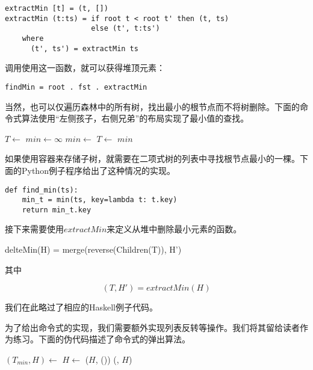 \documentclass{ctexart}
\begin{document}
\lstset{language=Haskell}
\begin{lstlisting}[style=Haskell]
extractMin [t] = (t, [])
extractMin (t:ts) = if root t < root t' then (t, ts)
                    else (t', t:ts')
    where
      (t', ts') = extractMin ts
\end{lstlisting}

调用使用这一函数，就可以获得堆顶元素：

\begin{lstlisting}[style=Haskell]
findMin = root . fst . extractMin
\end{lstlisting}

当然，也可以仅遍历森林中的所有树，找出最小的根节点而不将树删除。下面的命令式算法使用“左侧孩子，右侧兄弟”的布局实现了最小值的查找。

\begin{algorithmic}[1]
  \State $T \gets $ 
  \State $min \gets \infty$
      \State $min \gets $ 
    \EndIf
    \State $T \gets $ 
  \EndWhile
  \State \Return $min$
\EndFunction
\end{algorithmic}

如果使用容器来存储子树，就需要在二项式树的列表中寻找根节点最小的一棵。下面的Python例子程序给出了这种情况的实现。

\lstset{language=Python}
\begin{lstlisting}
def find_min(ts):
    min_t = min(ts, key=lambda t: t.key)
    return min_t.key
\end{lstlisting}

接下来需要使用$extractMin$来定义从堆中删除最小元素的函数。

\be
delteMin(H) = merge(reverse(Children(T)), H')
\ee

其中

\[
  (T, H') = extractMin(H)
\]

我们在此略过了相应的Haskell例子代码。

为了给出命令式的实现，我们需要额外实现列表反转等操作。我们将其留给读者作为练习。下面的伪代码描述了命令式的弹出算法。

\begin{algorithmic}[1]
  \State $(T_{min}, H) \gets$ 
  \State $H \gets$ ($H$, ())
  \State \Return (, $H$)
\EndFunction
\end{algorithmic}
\end{document}

